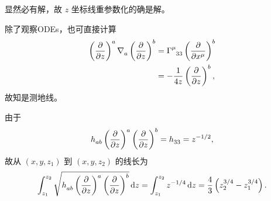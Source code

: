 \begin{xiti}
\begin{jie}
\begin{enumerate}[label=(\alph*)]
			显然必有解，故 $z$ 坐标线重参数化的确是解。
			\begin{tcolorbox}[breakable,title=另一验证方法,fonttitle=\normalfont\bfseries]
				除了观察ODEs，也可直接计算
				\begin{equation*}
					\begin{split}
						\tensor{\left( \pdv{z} \right)}{^a} \Nabla{a} \tensor{\left( \pdv{z} \right)}{^b} &= \ChristoffelSymbol{\mu}{3}{3} \tensor{\left( \pdv{x^\mu} \right)}{^b}\\
						&= -\frac{1}{4z} \tensor{\left( \pdv{z} \right)}{^b},
					\end{split}
				\end{equation*}
				故知是测地线。
			\end{tcolorbox}
			由于
			\begin{equation*}
				\tensor{h}{_a_b} \tensor{\left( \pdv{z} \right)}{^a} \tensor{\left( \pdv{z} \right)}{^b} = \tensor{h}{_3_3} = z^{-1/2},
			\end{equation*}
			故从 $\left( x,y,z_1 \right)$ 到 $(x,y,z_2)$ 的线长为
			\begin{equation*}
				\int_{z_1}^{z_2} \sqrt{\tensor{h}{_a_b} \tensor{\left( \pdv{z} \right)}{^a} \tensor{\left( \pdv{z} \right)}{^b}} \dd{z} = \int_{z_1}^{z_2} z^{-1/4} \dd{z} = \frac{4}{3} \left( z_2^{3/4} - z_1^{3/4} \right).
			\end{equation*}
		\end{enumerate}
	\end{jie}


\end{xiti}
